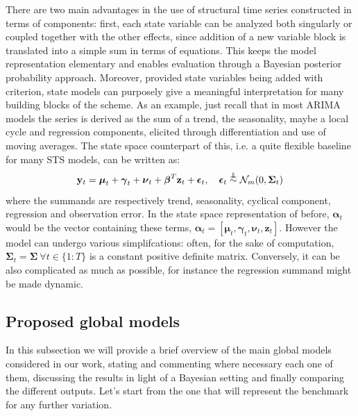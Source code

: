 \documentclass[11pt,twoside]{report}
\newcommand\independent{\protect\mathpalette{\protect\independenT}{\perp}}
\def\independenT#1#2{\mathrel{\rlap{$#1#2$}\mkern2mu{#1#2}}}
\begin{document}
There are two main advantages in the use of structural time series constructed in terms of components: first, each state variable can be analyzed both singularly or coupled together with the other effects, since addition of a new variable block is translated into a simple sum in terms of equations. This keeps the model representation elementary and enables evaluation through a Bayesian posterior probability approach. Moreover, provided state variables being added with criterion, state models can purposely give a meaningful interpretation for many building blocks of the scheme. As an example, just recall that in most ARIMA models the series is derived as the sum of a trend, the seasonality, maybe a local cycle and regression components, elicited through differentiation and use of moving averages. The state space counterpart of this, i.e. a quite flexible baseline for many STS models, can be written as:
\begin{equation}
\mathbf{y}_t = \boldsymbol{\mu}_t + \boldsymbol{\gamma}_t + \boldsymbol{\nu}_t + \boldsymbol{\beta}^T \mathbf{z}_t + \boldsymbol{\epsilon}_t
,\quad \boldsymbol{\epsilon}_t\overset{\independent}{\sim} \mathcal{N}_m(0, \boldsymbol{\Sigma}_t)
\end{equation}
where the summands are respectively trend, seasonality, cyclical component, regression and observation error. In the state space representation of before, $ \boldsymbol{\alpha}_t $ would be the vector containing these terms, $ \boldsymbol{\alpha}_t = [\boldsymbol{\mu}_t, \boldsymbol{\gamma}_t, \boldsymbol{\nu}_t, \mathbf{z}_t] $. However the model can undergo various simplifcations: often, for the sake of computation, $ \boldsymbol{\Sigma}_t=\boldsymbol{\Sigma}\ \forall t \in \{1:T\} $ is a constant positive definite matrix. Conversely, it can be also complicated as much as possible, for instance the regression summand might be made dynamic.

\subsection{Proposed global models}
In this subsection we will provide a brief overview of the main global models considered in our work, stating and commenting where necessary each one of them, discussing the results in light of a Bayesian setting and finally comparing the different outputs. Let's start from the one that will represent the benchmark for any further variation.
\end{document}

